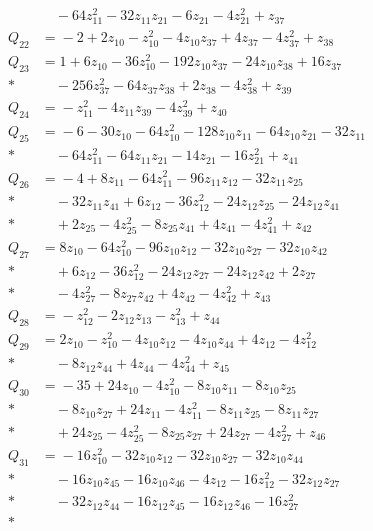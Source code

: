 \begin{align*}
&\quad{} - 64z_{11}^{2} - 32z_{11}z_{21} - 6z_{21} - 4z_{21}^{2} + z_{37}\\[4pt]
Q_{22} &={}-2 + 2z_{10} - z_{10}^{2} - 4z_{10}z_{37} + 4z_{37} - 4z_{37}^{2} + z_{38}\\[4pt]
Q_{23} &={}1 + 6z_{10} - 36z_{10}^{2} - 192z_{10}z_{37} - 24z_{10}z_{38} + 16z_{37}\\*
&\quad{} - 256z_{37}^{2} - 64z_{37}z_{38} + 2z_{38} - 4z_{38}^{2} + z_{39}\\[4pt]
Q_{24} &={}-z_{11}^{2} - 4z_{11}z_{39} - 4z_{39}^{2} + z_{40}\\[4pt]
Q_{25} &={}-6 - 30z_{10} - 64z_{10}^{2} - 128z_{10}z_{11} - 64z_{10}z_{21} - 32z_{11}\\*
&\quad{} - 64z_{11}^{2} - 64z_{11}z_{21} - 14z_{21} - 16z_{21}^{2} + z_{41}\\[4pt]
Q_{26} &={}-4 + 8z_{11} - 64z_{11}^{2} - 96z_{11}z_{12} - 32z_{11}z_{25}\\*
&\quad{} - 32z_{11}z_{41} + 6z_{12} - 36z_{12}^{2} - 24z_{12}z_{25} - 24z_{12}z_{41}\\*
&\quad{} + 2z_{25} - 4z_{25}^{2} - 8z_{25}z_{41} + 4z_{41} - 4z_{41}^{2} + z_{42}\\[4pt]
Q_{27} &={}8z_{10} - 64z_{10}^{2} - 96z_{10}z_{12} - 32z_{10}z_{27} - 32z_{10}z_{42}\\*
&\quad{} + 6z_{12} - 36z_{12}^{2} - 24z_{12}z_{27} - 24z_{12}z_{42} + 2z_{27}\\*
&\quad{} - 4z_{27}^{2} - 8z_{27}z_{42} + 4z_{42} - 4z_{42}^{2} + z_{43}\\[4pt]
Q_{28} &={}-z_{12}^{2} - 2z_{12}z_{13} - z_{13}^{2} + z_{44}\\[4pt]
Q_{29} &={}2z_{10} - z_{10}^{2} - 4z_{10}z_{12} - 4z_{10}z_{44} + 4z_{12} - 4z_{12}^{2}\\*
&\quad{} - 8z_{12}z_{44} + 4z_{44} - 4z_{44}^{2} + z_{45}\\[4pt]
Q_{30} &={}-35 + 24z_{10} - 4z_{10}^{2} - 8z_{10}z_{11} - 8z_{10}z_{25}\\*
&\quad{} - 8z_{10}z_{27} + 24z_{11} - 4z_{11}^{2} - 8z_{11}z_{25} - 8z_{11}z_{27}\\*
&\quad{} + 24z_{25} - 4z_{25}^{2} - 8z_{25}z_{27} + 24z_{27} - 4z_{27}^{2} + z_{46}\\[4pt]
Q_{31} &={}-16z_{10}^{2} - 32z_{10}z_{12} - 32z_{10}z_{27} - 32z_{10}z_{44}\\*
&\quad{} - 16z_{10}z_{45} - 16z_{10}z_{46} - 4z_{12} - 16z_{12}^{2} - 32z_{12}z_{27}\\*
&\quad{} - 32z_{12}z_{44} - 16z_{12}z_{45} - 16z_{12}z_{46} - 16z_{27}^{2}\\*

\end{align*}
